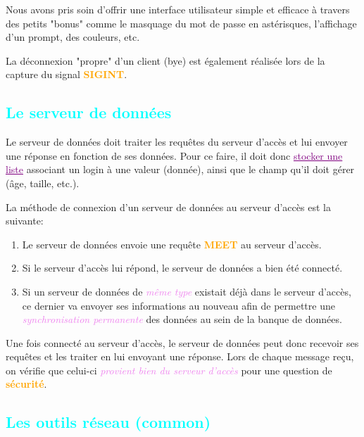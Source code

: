 \documentclass[a4paper]{article}
\let\oldsubsection\subsection{}
\renewcommand{\subsection}[1]{\textcolor{cyan}{\oldsubsection{#1}}}
\let\oldtextbf\textbf
\renewcommand{\textbf}[1]{\textcolor{orange}{\oldtextbf{#1}}}
\let\oldunderline\underline{}
\renewcommand{\underline}[1]{\textcolor{purple}{\oldunderline{#1}}}
\let\oldtextit\textit
\renewcommand{\textit}[1]{\textcolor{violet}{\oldtextit{#1}}}
\begin{document}
Nous avons pris soin d'offrir une interface utilisateur simple et efficace à travers des petits "bonus" comme le masquage du mot de passe en astérisques, l'affichage d'un prompt, des couleurs, etc.

La déconnexion "propre" d'un client (bye) est également réalisée lors de la capture du signal \textbf{SIGINT}.

\subsection{Le serveur de données}

Le serveur de données doit traiter les requêtes du serveur d'accès et lui envoyer une réponse en fonction de ses données. Pour ce faire, il doit donc \underline{stocker une liste} associant un login à une valeur (donnée), ainsi que le champ qu'il doit gérer (âge, taille, etc.).

La méthode de connexion d'un serveur de données au serveur d'accès est la suivante:
\begin{enumerate}
    \item Le serveur de données envoie une requête \textbf{MEET} au serveur d'accès.
    \item Si le serveur d'accès lui répond, le serveur de données a bien été connecté.
    \item Si un serveur de données de \textit{même type} existait déjà dans le serveur d'accès, ce dernier va envoyer ses informations au nouveau afin de permettre une \textit{synchronisation permanente} des données au sein de la banque de données.
\end{enumerate}

Une fois connecté au serveur d'accès, le serveur de données peut donc recevoir ses requêtes et les traiter en lui envoyant une réponse. Lors de chaque message reçu, on vérifie que celui-ci \textit{provient bien du serveur d'accès} pour une question de \textbf{sécurité}.

\subsection{Les outils réseau (common)}
\end{document}
